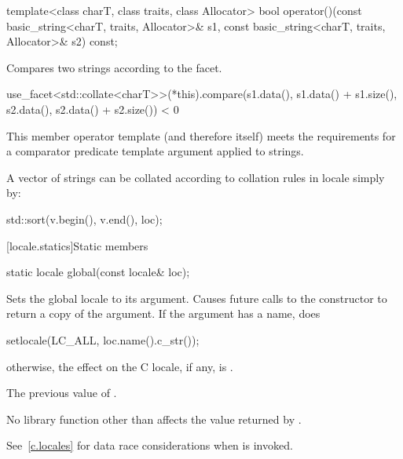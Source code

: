 %
\begin{itemdecl}
template<class charT, class traits, class Allocator>
  bool operator()(const basic_string<charT, traits, Allocator>& s1,
                  const basic_string<charT, traits, Allocator>& s2) const;
\end{itemdecl}

\begin{itemdescr}
\pnum
\effects
Compares two strings according to the  facet.

\pnum
\returns
\begin{codeblock}
use_facet<std::collate<charT>>(*this).compare(s1.data(), s1.data() + s1.size(),
                                              s2.data(), s2.data() + s2.size()) < 0
\end{codeblock}

\pnum
\remarks
This member operator template (and therefore  itself)
meets the requirements for
a comparator predicate template argument applied to strings.

\pnum
\begin{example}
A vector of strings 
can be collated according to collation rules in locale 
simply by:

\begin{codeblock}
std::sort(v.begin(), v.end(), loc);
\end{codeblock}
\end{example}
\end{itemdescr}

[locale.statics]{Static members}

%
\begin{itemdecl}
static locale global(const locale& loc);
\end{itemdecl}

\begin{itemdescr}
\pnum
\effects
Sets the global locale to its argument.
Causes future calls to the constructor 
to return a copy of the argument.
If the argument has a name, does
\begin{codeblock}
setlocale(LC_ALL, loc.name().c_str());
\end{codeblock}
otherwise, the effect on the C locale, if any, is
.

\pnum
\returns
The previous value of .

\pnum
\remarks
No library function other than 
affects the value returned by .
\begin{note}
See~\ref{c.locales} for data race considerations
when  is invoked.
\end{note}
\end{itemdescr}

